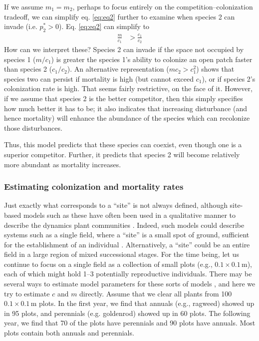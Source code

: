  If we assume $m_1=m_2$, perhaps to focus entirely on the competition--colonization tradeoff, we can simplify eq. \ref{eq:eq2} further to examine when species 2 can invade (i.e. $p_2^* >0$). Eq. \ref{eq:eq2} can simplify to
\begin{align}
  \label{eq:cc7}
  \frac{m}{c_1} &> \frac{c_1}{c_2}
\end{align}
How can we interpret these? Species 2 can invade if the space not occupied by species 1 ($m/c_1$) is greater the species 1's ability to colonize an open patch faster than species 2 ($c_1/c_2$). An alternative representation ($mc_2 > c_1^2$) shows that species two can persist if mortality is high (but cannot exceed $c_1$), or if species 2's colonization rate is high. That seems fairly restrictive, on the face of it. However, if we assume that species 2 is the better competitor, then this simply specifies how much better it has to be; it also indicates that increasing disturbance (and hence mortality) will enhance the abundance of the species which can recolonize those disturbances.

Thus, this model predicts that these species can coexist, even though one is a superior competitor. Further, it predicts that species 2 will become relatively more abundant as mortality increases.


\subsubsection{Estimating colonization and mortality rates}
Just exactly what corresponds to a ``site'' is not always defined, although site-based models such as these have often been used in a qualitative manner to describe the dynamics plant communities \cite{Hurtt1995, Tilman1994, Pacala1997, Pacala1998}. Indeed, such models could describe systems such as a single field, where a ``site'' is a small spot of ground, sufficient for the establishment of an individual \cite{Tilman1994}. Alternatively, a ``site'' could be an entire field in a large region of mixed successional stages. For the time being, let us continue to focus on a single field as a collection of small plots (e.g., $0.1 \times 0.1$\,m), each of which might hold 1--3 potentially reproductive individuals. There may be several ways to estimate model parameters for these sorts of models \cite{Pacala1998, Tilman1994}, and here we try to estimate $c$ and $m$ directly. Assume that we clear all plants from 100 $0.1 \times 0.1$\,m  plots. In the first year, we find that annuals (e.g., ragweed) showed up in 95 plots, and perennials (e.g. goldenrod) showed up in 60 plots. The following year, we find that 70 of the plots have perennials and 90 plots have annuals. Most plots contain both annuals and perennials.


